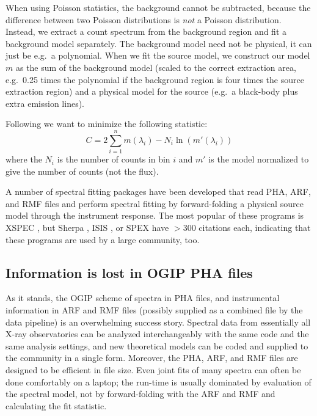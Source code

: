 \documentclass[fleqn,12pt,onecolumn]{SelfArx} %
\begin{document}
When using Poisson statistics, the background cannot be subtracted, because the
difference between two Poisson distributions is \emph{not} a Poisson
distribution. Instead, we extract a count spectrum from the background region
and fit a background model separately. The background model need
not be physical, it can just be e.g.\  a polynomial. When we fit the source
model, we construct our model $m$ as the sum of the background model (scaled to
the correct extraction area, e.g.\ 0.25 times the polynomial if the background
region is four times the source extraction region) and a physical model for
the source (e.g.\ a black-body plus extra emission lines).

Following \citet{1979ApJ...228..939C} we want to minimize the following statistic:
\begin{equation}
C = 2\sum_{i=1}^n m(\lambda_i) - N_i \ln(m'(\lambda_i))
\label{eqn}
\end{equation}
where the $N_i$ is the number of counts in bin
$i$ and $m'$ is the model normalized to give the number of counts (not the flux).

A number of spectral fitting packages have been developed
that read PHA, ARF, and RMF files and perform spectral fitting by forward-folding a physical source model through the instrument response.
The
most popular of these programs is XSPEC \citep{1996ASPC..101...17A}, but Sherpa
\citep{2001SPIE.4477...76F}, ISIS \citep{2000ASPC..216..591H}, or SPEX
\citep{1996uxsa.conf..411K} have $>300$ citations each, indicating that these
programs are used by a large community, too.


\subsection{Information is lost in OGIP PHA files}
As it stands, the OGIP scheme of spectra in PHA files, and instrumental information in ARF and RMF files (possibly supplied as a combined file by the data pipeline) is an overwhelming success story. Spectral data from essentially all X-ray observatories can be analyzed interchangeably with the same code and the same analysis settings, and new theoretical models can be coded and supplied to the community in a single form. Moreover, the PHA, ARF, and RMF files are designed to be efficient in file size. Even joint fits of many spectra can often be done comfortably on a laptop; the run-time is usually dominated by evaluation of the spectral model, not by forward-folding with the ARF and RMF and calculating the fit statistic.
\end{document}
